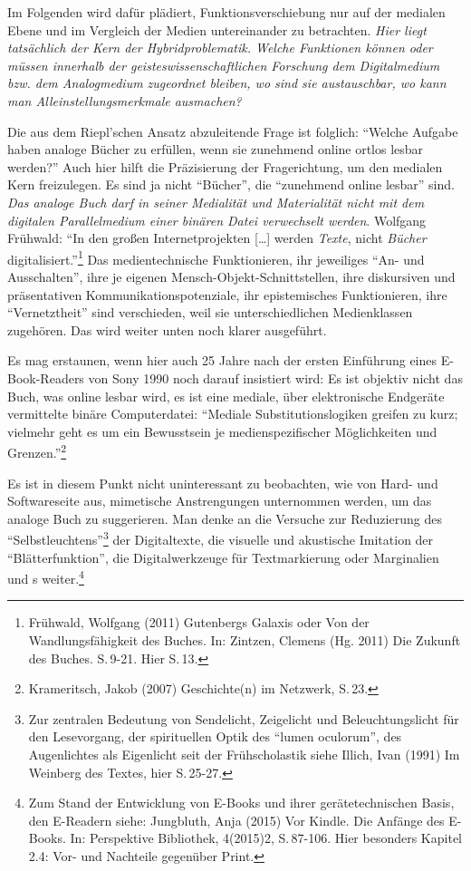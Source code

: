 \documentclass[a4paper,
fontsize=11pt,
oneside,
numbers=noperiodatend,
parskip=half-,
bibliography=totoc,
final
]{scrartcl}
\begin{document}
Im Folgenden wird dafür plädiert, Funktionsverschiebung nur auf der
medialen Ebene und im Vergleich der Medien untereinander zu betrachten.
\emph{Hier liegt tatsächlich der Kern der Hybridproblematik. Welche
Funktionen können oder müssen innerhalb der geisteswissenschaftlichen
Forschung dem Digitalmedium bzw. dem Analogmedium zugeordnet bleiben, wo
sind sie austauschbar, wo kann man Alleinstellungsmerkmale ausmachen?}

Die aus dem Riepl'schen Ansatz abzuleitende Frage ist folglich:
\enquote{Welche Aufgabe haben analoge Bücher zu erfüllen, wenn sie
zunehmend online ortlos lesbar werden?} Auch hier hilft die Präzisierung
der Fragerichtung, um den medialen Kern freizulegen. Es sind ja nicht
\enquote{Bücher}, die \enquote{zunehmend online lesbar} sind. \emph{Das
analoge Buch darf in seiner Medialität und Materialität nicht mit dem
digitalen Parallelmedium einer binären Datei verwechselt werden}.
Wolfgang Frühwald: \enquote{In den großen Internetprojekten
{[}\ldots{}{]} werden \emph{Texte}, nicht \emph{Bücher}
digitalisiert.}\footnote{Frühwald, Wolfgang (2011) Gutenbergs Galaxis
  oder Von der Wandlungsfähigkeit des Buches. In: Zintzen, Clemens (Hg.
  2011) Die Zukunft des Buches. S.\,9-21. Hier S.\,13.} Das
medientechnische Funktionieren, ihr jeweiliges \enquote{An- und
Ausschalten}, ihre je eigenen Mensch-Objekt-Schnitt\-stellen, ihre
diskursiven und präsentativen Kommunikationspotenziale, ihr
epistemisches Funktionieren, ihre \enquote{Vernetztheit} sind
verschieden, weil sie unterschiedlichen Medienklassen zugehören. Das
wird weiter unten noch klarer ausgeführt.

Es mag erstaunen, wenn hier auch 25 Jahre nach der ersten Einführung
eines E-Book-Readers von Sony 1990 noch darauf insistiert wird: Es ist
objektiv nicht das Buch, was online lesbar wird, es ist eine mediale,
über elektronische Endgeräte vermittelte binäre Computerdatei:
\enquote{Mediale Substitutionslogiken greifen zu kurz; vielmehr geht es
um ein Bewusstsein je medienspezifischer Möglichkeiten und
Grenzen.}\footnote{Krameritsch, Jakob (2007) Geschichte(n) im Netzwerk,
  S.\,23.}

Es ist in diesem Punkt nicht uninteressant zu beobachten, wie von Hard-
und Softwareseite aus, mimetische Anstrengungen unternommen werden, um
das analoge Buch zu suggerieren. Man denke an die Versuche zur
Reduzierung des \enquote{Selbstleuchtens}\footnote{Zur zentralen
  Bedeutung von Sendelicht, Zeigelicht und Beleuchtungslicht für den
  Lesevorgang, der spirituellen Optik des \enquote{lumen oculorum}, des
  Augenlichtes als Eigenlicht seit der Frühscholastik siehe Illich, Ivan
  (1991) Im Weinberg des Textes, hier S.\,25-27.} der Digitaltexte, die
visuelle und akustische Imitation der \enquote{Blätterfunktion}, die
Digitalwerkzeuge für Textmarkierung oder Marginalien und s
weiter.\footnote{Zum Stand der Entwicklung von E-Books und ihrer
  gerätetechnischen Basis, den E-Readern siehe: Jungbluth, Anja (2015)
  Vor Kindle. Die Anfänge des E-Books. In: Perspektive Bibliothek,
  4(2015)2, S.\,87-106. Hier besonders Kapitel 2.4: Vor- und Nachteile
  gegenüber Print.}
\end{document}
